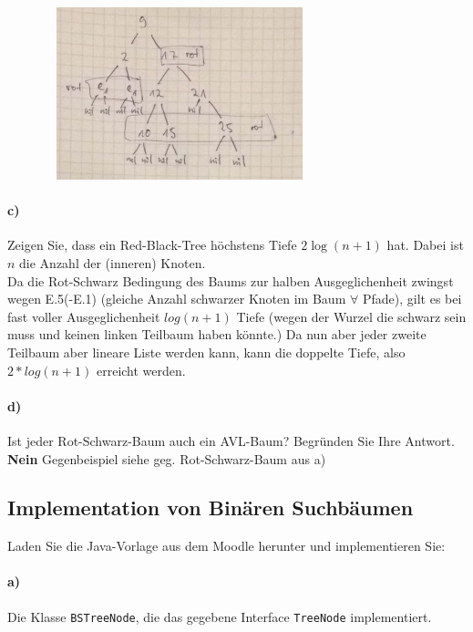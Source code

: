 \documentclass[paper=a4, fontsize=11pt]{scrartcl}
\numberwithin{equation}{section}
\numberwithin{figure}{section}
\numberwithin{table}{section}
\begin{document}
\includegraphics[width=10cm,height=5cm]{baum06A3b.jpg} \\

\paragraph{c)}
Zeigen Sie, dass ein Red-Black-Tree höchstens Tiefe $2\log(n+1)$ hat. Dabei ist
$n$ die Anzahl der (inneren) Knoten. \\

Da die Rot-Schwarz Bedingung des Baums zur halben Ausgeglichenheit zwingst wegen E.5(-E.1) (gleiche Anzahl schwarzer Knoten im Baum $\forall$ Pfade), gilt es bei fast voller Ausgeglichenheit $log(n+1)$ Tiefe (wegen der Wurzel die schwarz sein muss und keinen linken Teilbaum haben könnte.) Da nun aber jeder zweite Teilbaum aber lineare Liste werden kann, kann die doppelte Tiefe, also $2*log(n+1)$ erreicht werden.

\paragraph{d)} 
Ist jeder Rot-Schwarz-Baum auch ein AVL-Baum? Begründen Sie Ihre Antwort. \\

\textbf{Nein}
Gegenbeispiel siehe geg. Rot-Schwarz-Baum aus a)

\subsection{Implementation von Binären Suchbäumen}
Laden Sie die Java-Vorlage aus dem Moodle herunter und implementieren Sie:

\paragraph{a)} 
Die Klasse \texttt{BSTreeNode}, die das gegebene Interface \texttt{TreeNode} implementiert.
\end{document}
